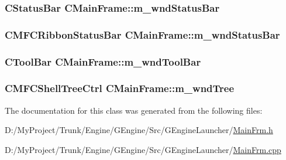 \subsubsection[{m\+\_\+wnd\+Status\+Bar}]{\setlength{\rightskip}{0pt plus 5cm}C\+Status\+Bar C\+Main\+Frame\+::m\+\_\+wnd\+Status\+Bar\hspace{0.3cm}{\ttfamily [protected]}}\label{class_c_main_frame_ac01bafc03aee69cf982e6f029b4db6b0}
\hypertarget{class_c_main_frame_a244ce6ad929a1cb6a2a109eecdafe726}{}
\subsubsection[{m\+\_\+wnd\+Status\+Bar}]{\setlength{\rightskip}{0pt plus 5cm}C\+M\+F\+C\+Ribbon\+Status\+Bar C\+Main\+Frame\+::m\+\_\+wnd\+Status\+Bar\hspace{0.3cm}{\ttfamily [protected]}}\label{class_c_main_frame_a244ce6ad929a1cb6a2a109eecdafe726}
\hypertarget{class_c_main_frame_a73024d794dce2fe918f6b117371c25fc}{}
\subsubsection[{m\+\_\+wnd\+Tool\+Bar}]{\setlength{\rightskip}{0pt plus 5cm}C\+Tool\+Bar C\+Main\+Frame\+::m\+\_\+wnd\+Tool\+Bar\hspace{0.3cm}{\ttfamily [protected]}}\label{class_c_main_frame_a73024d794dce2fe918f6b117371c25fc}
\hypertarget{class_c_main_frame_a681ffb32a0f664b09806be7da883073f}{}
\subsubsection[{m\+\_\+wnd\+Tree}]{\setlength{\rightskip}{0pt plus 5cm}C\+M\+F\+C\+Shell\+Tree\+Ctrl C\+Main\+Frame\+::m\+\_\+wnd\+Tree\hspace{0.3cm}{\ttfamily [protected]}}\label{class_c_main_frame_a681ffb32a0f664b09806be7da883073f}


The documentation for this class was generated from the following files\+:\begin{DoxyCompactItemize}
\item 
D\+:/\+My\+Project/\+Trunk/\+Engine/\+G\+Engine/\+Src/\+G\+Engine\+Launcher/\hyperlink{_g_engine_launcher_2_main_frm_8h}{Main\+Frm.\+h}\item 
D\+:/\+My\+Project/\+Trunk/\+Engine/\+G\+Engine/\+Src/\+G\+Engine\+Launcher/\hyperlink{_g_engine_launcher_2_main_frm_8cpp}{Main\+Frm.\+cpp}\end{DoxyCompactItemize}
